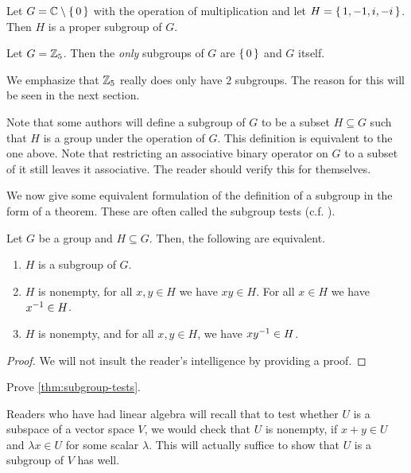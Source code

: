 \documentclass[./algebra-notes.tex]{subfiles}
\begin{document}
\begin{example}
    Let $G = \mathbb{C} \setminus \set{0}$ with the operation of multiplication and let
    $H = \set{1, -1, i, -i}$. Then $H$ is a proper subgroup of $G$.
\end{example}

\begin{example}
    Let $G = \mathbb{Z}_5$. Then the \emph{only} subgroups of $G$ are $\set{0}$ and $G$ itself.
\end{example}
We emphasize that $\mathbb{Z}_5$ really does only have 2 subgroups. The reason for this
will be seen in the next section.


Note that some authors will define a subgroup of $G$ to be a subset $H \subseteq
G$ such that $H$ is a group under the operation of $G$. This definition is
equivalent to the one above. Note that restricting an associative binary
operator on $G$ to a subset of it still leaves it associative. The reader should
verify this for themselves.

We now give some equivalent formulation of the definition of a subgroup in the
form of a theorem. These are often called the subgroup tests (c.f. \cite{Gallian_2020}).
\begin{theorem}
\label{thm:subgroup-tests}
    Let $G$ be a group and $H \subseteq G$. Then, the following are equivalent.
    \begin{enumerate}
        \item $H$ is a subgroup of $G$.
        \item $H$ is nonempty, for all $x ,y \in H$ we have $xy \in H$. For all
        $x \in H$ we have $x ^{-1} \in H$.
        \item $H$ is nonempty, and for all $x,y \in H$, we have $xy^{-1} \in H$.
    \end{enumerate}
\end{theorem}
\begin{proof}
    We will not insult the reader's intelligence by providing a proof.
\end{proof}
\begin{exercise}
    Prove \cref{thm:subgroup-tests}.
\end{exercise}

Readers who have had linear algebra will recall that to test whether $U$ is a
subspace of a vector space $V$, we would check that $U$ is nonempty, if $x + y
\in U$ and $\lambda x \in U$ for some scalar $\lambda$. This will actually
suffice to show that $U$ is a subgroup of $V$ has well. 
\end{document}
